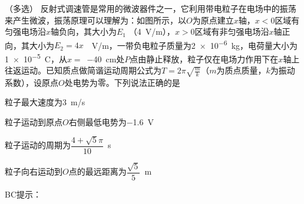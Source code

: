 （多选）
反射式调速管是常用的微波器件之一，它利用带电粒子在电场中的振荡来产生微波，振荡原理可以理解为：如图所示，以\(O\)为原点建立\(x\)轴，\(x < 0\)区域有匀强电场沿\(x\)轴负向，其大小为\(E_1\) （\qty{4}{V/m}），\(x > 0\)区域有非匀强电场沿\(x\)轴正向，其大小为\(E_2 = 4x\) \,\qty{}{V/m}，一带负电粒子质量为\qty{2e-6}{kg}，电荷量大小为\qty{1e-5}{C}，从\(x =\) \,\qty{-40}{cm}处\(P\)点由静止释放，粒子仅在电场力作用下在\(x\)轴上往返运动。已知质点做简谐运动周期公式为\(T = 2\pi \sqrt{\frac{m}{k}}\)（\(m\)为质点质量，\(k\)为振动系数），设原点\(O\)处电势为零。下列说法正确的是\paren[]

\begin{choices}
	\item 粒子最大速度为\qty{3}{m/s}
	\item 粒子运动到原点\(O\)右侧最低电势为\qty{-1.6}{V}
	\item 粒子运动的周期为\(\dfrac{4 + \sqrt{5}\pi}{10}\)\qty{}{s}
	\item 粒子向右运动到\(O\)点的最远距离为\(\dfrac{\sqrt{5}}{5}\)\qty{}{m}
\end{choices}
\begin{answer}
	BC\qquad 提示：
\end{answer}